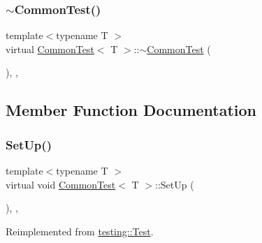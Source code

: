 \mbox{\label{class_common_test_a675a632fcf7b1fd961fefc619d6a458d}} 
\subsubsection{\texorpdfstring{$\sim$\+Common\+Test()}{~CommonTest()}}
{\footnotesize\ttfamily template$<$typename T $>$ \\
virtual \hyperlink{class_common_test}{Common\+Test}$<$ T $>$\+::$\sim$\hyperlink{class_common_test}{Common\+Test} (\begin{DoxyParamCaption}{ }\end{DoxyParamCaption})\hspace{0.3cm}{\ttfamily [inline]}, {\ttfamily [protected]}, {\ttfamily [virtual]}}



\subsection{Member Function Documentation}
\mbox{\label{class_common_test_a4c7bf7889ce48a9d06530bc4a437f3f5}} 
\subsubsection{\texorpdfstring{Set\+Up()}{SetUp()}}
{\footnotesize\ttfamily template$<$typename T $>$ \\
virtual void \hyperlink{class_common_test}{Common\+Test}$<$ T $>$\+::Set\+Up (\begin{DoxyParamCaption}{ }\end{DoxyParamCaption})\hspace{0.3cm}{\ttfamily [inline]}, {\ttfamily [protected]}, {\ttfamily [virtual]}}



Reimplemented from \hyperlink{classtesting_1_1_test_a190315150c303ddf801313fd1a777733}{testing\+::\+Test}.

\mbox{\label{class_common_test_a6edd90f32f45cc49e4a423b22bd770ce}} 
